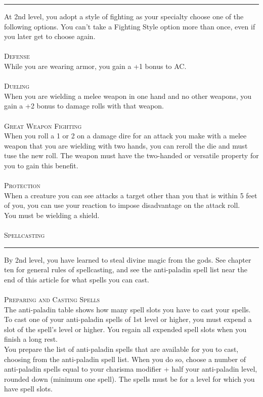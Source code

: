 \documentclass[22pt,a4paper]{article}
\newcommand{\HRule}[2]{\par
  \vspace*{\dimexpr-\parskip-\baselineskip+#2}
  \begingroup
  	\color{sepcol}
  	\noindent\rule{\linewidth}{#1}\par
  \endgroup  
  \vspace*{\dimexpr-\parskip-.5\baselineskip+#2}}
\begin{document}
\begin{multicols*}{2}
\HRule{1pt}{8pt}
At 2nd level, you adopt a style of fighting as your specialty choose one of the following options. You can't take a Fighting Style option more than once, even if you later get to choose again.\\
\\
{\fontsize{12pt}{12pt}\textcolor{title}{\textsc{Defense}}}\\
While you are wearing armor, you gain a +1 bonus to AC.\\
\\
{\fontsize{12pt}{12pt}\textcolor{title}{\textsc{Dueling}}}\\
When you are wielding a melee weapon in one hand and no other weapons, you gain a +2 bonus to damage rolls with that weapon.\\
\\
{\fontsize{12pt}{12pt}\textcolor{title}{\textsc{Great Weapon Fighting}}}\\
When you roll a 1 or 2 on a damage dire for an attack you make with a melee weapon that you are wielding with two hands, you can reroll the die and must tuse the new roll. The weapon must have the two-handed or versatile property for you to gain this benefit.\\
\\
{\fontsize{12pt}{12pt}\textcolor{title}{\textsc{Protection}}}\\
When a creature you can see attacks a target other than you that is within 5 feet of you, you can use your reaction to impose disadvantage on the attack roll.\\
You must be wielding a shield.\\
\\
{\fontsize{14pt}{14pt}\textcolor{title}{\textsc{Spellcasting}}}
\HRule{1pt}{8pt}
By 2nd level, you have learned to steal divine magic from the gods. See chapter ten for general rules of spellcasting, and see the anti-paladin spell list near the end of this article for what spells you can cast.\\
\\
{\fontsize{12pt}{12pt}\textcolor{title}{\textsc{Preparing and Casting Spells}}}\\
The anti-paladin table shows how many spell slots you have to cast your spells. To cast one of your anti-paladin spells of 1st level or higher, you must expend a slot of the spell’s level or higher. You regain all expended spell slots when you finish a long rest.\\
\indent You prepare the list of anti-paladin spells that are available for you to cast, choosing from the anti-paladin spell list. When you do so, choose a number of anti-paladin spells equal to your charisma modifier + half your anti-paladin level, rounded down (minimum one spell). The spells must be for a level for which you have spell slots. \\

\end{multicols*}
\end{document}
